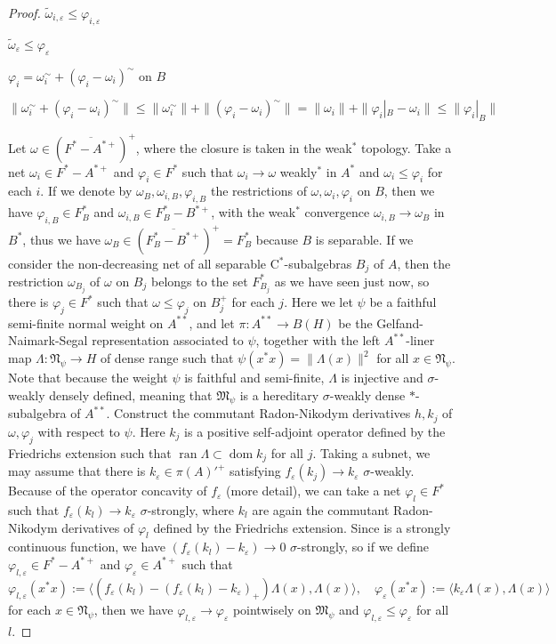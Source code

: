 \documentclass[a4paper]{amsart}
\newcommand{\e}{\varepsilon}
\theoremstyle{plain}
\theoremstyle{definition}
\begin{document}
\begin{proof}
$\widetilde\omega_{i,\e}\le\varphi_{i,\e}$

$\widetilde\omega_\e\le\varphi_\e$

$\varphi_i=\omega_i^\sim+(\varphi_i-\omega_i)^\sim$ on $B$

$\|\omega_i^\sim+(\varphi_i-\omega_i)^\sim\|\le\|\omega_i^\sim\|+\|(\varphi_i-\omega_i)^\sim\|=\|\omega_i\|+\|\varphi_i|_B-\omega_i\|\le\|\varphi_i|_B\|$


Let $\omega\in(\overline{F^*-A^{*+}})^+$, where the closure is taken in the weak$^*$ topology.
Take a net $\omega_i\in F^*-A^{*+}$ and $\varphi_i\in F^*$ such that $\omega_i\to\omega$ weakly$^*$ in $A^*$ and $\omega_i\le\varphi_i$ for each $i$.
If we denote by $\omega_B,\omega_{i,B},\varphi_{i,B}$ the restrictions of $\omega,\omega_i,\varphi_i$ on $B$, then we have $\varphi_{i,B}\in F^*_{B}$ and $\omega_{i,B}\in F^*_B-B^{*+}$, with the weak$^*$ convergence $\omega_{i,B}\to\omega_B$ in $B^*$, thus we have $\omega_B\in(\overline{F_B^*-B^{*+}})^+=F_B^*$ because $B$ is separable.
If we consider the non-decreasing net of all separable C$^*$-subalgebras $B_j$ of $A$, then the restriction $\omega_{B_j}$ of $\omega$ on $B_j$ belongs to the set $F_{B_j}^*$ as we have seen just now, so there is $\varphi_j\in F^*$ such that $\omega\le\varphi_j$ on $B_j^+$ for each $j$.
Here we let $\psi$ be a faithful semi-finite normal weight on $A^{**}$, and let $\pi:A^{**}\to B(H)$ be the Gelfand-Naimark-Segal representation associated to $\psi$, together with the left $A^{**}$-liner map $\Lambda:\mathfrak{N}_\psi\to H$ of dense range such that $\psi(x^*x)=\|\Lambda(x)\|^2$ for all $x\in\mathfrak{N}_\psi$.
Note that because the weight $\psi$ is faithful and semi-finite, $\Lambda$ is injective and $\sigma$-weakly densely defined, meaning that $\mathfrak{M}_\psi$ is a hereditary $\sigma$-weakly dense $*$-subalgebra of $A^{**}$.
Construct the commutant Radon-Nikodym derivatives $h,k_j$ of $\omega,\varphi_j$ with respect to $\psi$.
Here $k_j$ is a positive self-adjoint operator defined by the Friedrichs extension such that $\operatorname{ran}\Lambda\subset\operatorname{dom}k_j$ for all $j$.
Taking a subnet, we may assume that there is $k_\e\in\pi(A)'^+$ satisfying $f_\e(k_j)\to k_\e$ $\sigma$-weakly.
Because of the operator concavity of $f_\e$ (more detail), we can take a net $\varphi_l\in F^*$ such that $f_\e(k_l)\to k_\e$ $\sigma$-strongly, where $k_l$ are again the commutant Radon-Nikodym derivatives of $\varphi_l$ defined by the Friedrichs extension.
Since  is a strongly continuous function, we have $(f_\e(k_l)-k_\e)\to0$ $\sigma$-strongly, so if we define $\varphi_{l,\e}\in F^*-A^{*+}$ and $\varphi_\e\in A^{*+}$ such that
\[\varphi_{l,\e}(x^*x):=\langle(f_\e(k_l)-(f_\e(k_l)-k_\e)_+)\Lambda(x),\Lambda(x)\rangle,\quad\varphi_\e(x^*x):=\langle k_\e\Lambda(x),\Lambda(x)\rangle\]
for each $x\in\mathfrak{N}_\psi$, then we have $\varphi_{l,\e}\to\varphi_\e$ pointwisely on $\mathfrak{M}_\psi$ and $\varphi_{l,\e}\le\varphi_\e$ for all $l$.


\end{proof}
\end{document}
